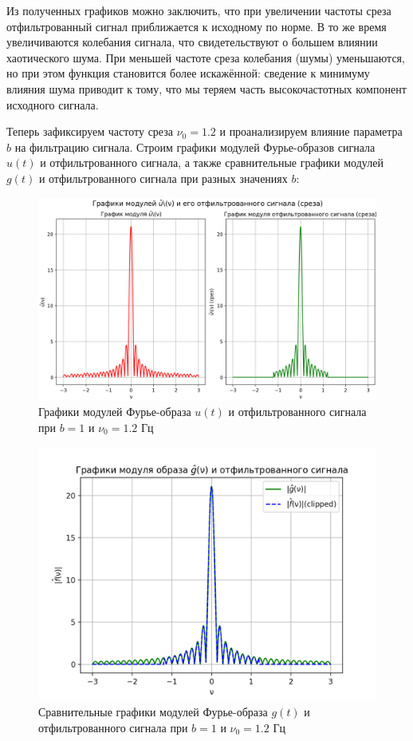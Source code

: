 Из полученных графиков можно заключить, что при увеличении частоты среза отфильтрованный сигнал приближается к исходному по норме. В то же время увеличиваются колебания сигнала, что свидетельствуют о большем влиянии хаотического шума. При меньшей частоте среза колебания (шумы) уменьшаются, но при этом функция становится более искажённой: сведение к минимуму влияния шума приводит к тому, что мы теряем часть высокочастотных компонент исходного сигнала.

Теперь зафиксируем частоту среза $\nu_0=1.2$ и проанализируем влияние параметра $b$ на фильтрацию сигнала. Строим графики модулей Фурье-образов сигнала $u(t)$ и отфильтрованного сигнала, а также сравнительные графики модулей $g(t)$ и отфильтрованного сигнала при разных значениях $b$:



\begin{figure}[ht!]
    \centering
    \includegraphics[scale=0.55]{media/1 task/high_freq/Fourier_Image_1_-1,1981981981981982.png}
    \caption{Графики модулей Фурье-образа $u (t)$ и отфильтрованного сигнала при $b=1$ и $\nu_0=1.2$ Гц}
    \label{fig:four_1_12}
\end{figure}

\begin{figure}[ht!]
    \centering
    \includegraphics[scale=0.55]{media/1 task/high_freq/Fourier_Image_Comparison_1_-1,1981981981981982.png}
    \caption{Сравнительные графики модулей Фурье-образа $g(t)$ и отфильтрованного сигнала при $b=1$ и $\nu_0=1.2$ Гц}
    \label{fig:fourc_1_12}
\end{figure}

